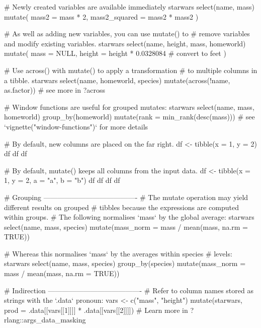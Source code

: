 \documentclass[a4paper]{book}
\begin{document}
\begin{Examples}
\begin{ExampleCode}
# Newly created variables are available immediately
starwars %
  select(name, mass) %
  mutate(
    mass2 = mass * 2,
    mass2_squared = mass2 * mass2
  )

# As well as adding new variables, you can use mutate() to
# remove variables and modify existing variables.
starwars %
  select(name, height, mass, homeworld) %
  mutate(
    mass = NULL,
    height = height * 0.0328084 # convert to feet
  )

# Use across() with mutate() to apply a transformation
# to multiple columns in a tibble.
starwars %
  select(name, homeworld, species) %
  mutate(across(!name, as.factor))
# see more in ?across

# Window functions are useful for grouped mutates:
starwars %
  select(name, mass, homeworld) %
  group_by(homeworld) %
  mutate(rank = min_rank(desc(mass)))
# see `vignette("window-functions")` for more details

# By default, new columns are placed on the far right.
df <- tibble(x = 1, y = 2)
df %
df %
df %

# By default, mutate() keeps all columns from the input data.
df <- tibble(x = 1, y = 2, a = "a", b = "b")
df %
df %
df %
df %

# Grouping ----------------------------------------
# The mutate operation may yield different results on grouped
# tibbles because the expressions are computed within groups.
# The following normalises `mass` by the global average:
starwars %
  select(name, mass, species) %
  mutate(mass_norm = mass / mean(mass, na.rm = TRUE))

# Whereas this normalises `mass` by the averages within species
# levels:
starwars %
  select(name, mass, species) %
  group_by(species) %
  mutate(mass_norm = mass / mean(mass, na.rm = TRUE))

# Indirection ----------------------------------------
# Refer to column names stored as strings with the `.data` pronoun:
vars <- c("mass", "height")
mutate(starwars, prod = .data[[vars[[1]]]] * .data[[vars[[2]]]])
# Learn more in ?rlang::args_data_masking
\end{ExampleCode}
\end{Examples}
\end{document}
